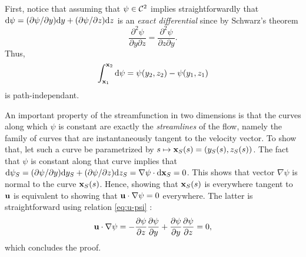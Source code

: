 \begin{tcolorbox}[title=Some properties of the streamfunction]
First, notice that assuming that $\psi \in \C^2$ implies straightforwardly that $\rm d\psi = (\partial \psi/\partial y)\rm dy + (\partial \psi/\partial z) \rm dz$ is an \textit{exact differential} since by Schwarz's theorem
\begin{equation}
	\frac{\partial^2 \psi}{\partial y \partial z} = \frac{\partial^2 \psi}{\partial z \partial y}.
\end{equation}
Thus,
\begin{equation}
\int_{\b x_1}^{\b x_2} \rm d\psi = \psi(y_2,z_2) - \psi(y_1,z_1)	
\end{equation}
is path-independant. 

An important property of the streamfunction in two dimensions is that the curves along which $\psi$ is constant are exactly the \textit{streamlines} of the flow, namely the family of curves that are instantaneously tangent to the velocity vector. To show that, let such a curve be parametrized by $s \mapsto \b x_S(s) = (y_S(s),z_S(s))$. The fact that $\psi$ is constant along that curve implies that $\rm d\psi_S = (\partial \psi/\partial y)\rm dy_S + (\partial \psi/\partial z) \rm dz_S = \nabla \psi \cdot \rm d \b x_S = 0$. This shows that vector $\nabla \psi$ is normal to the curve $\b x_S(s)$. Hence, showing that $\b x_S(s)$ is everywhere tangent to $\b u$ is equivalent to showing that $\b u \cdot \nabla \psi = 0$ everywhere. The latter is straightforward using relation \eqref{eq:u-psi} :
\begin{equation}
	\b u \cdot \nabla \psi = -\frac{\partial \psi}{\partial z}\frac{\partial \psi}{\partial y} + \frac{\partial \psi}{\partial y}\frac{\partial \psi}{\partial z} = 0,
\end{equation}
which concludes the proof.


\end{tcolorbox}
